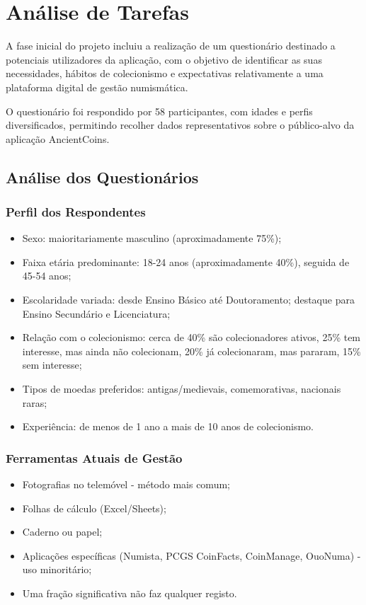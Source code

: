 \documentclass[12pt,a4paper]{article}
\begin{document}
\section{Análise de Tarefas}

A fase inicial do projeto incluiu a realização de um questionário destinado a potenciais utilizadores da aplicação, com o objetivo de identificar as suas necessidades, hábitos de colecionismo e expectativas relativamente a uma plataforma digital de gestão numismática.

O questionário foi respondido por 58 participantes, com idades e perfis diversificados, permitindo recolher dados representativos sobre o público-alvo da aplicação AncientCoins.

\subsection{Análise dos Questionários}

\subsubsection{Perfil dos Respondentes}

\begin{itemize}
\setlength{\itemsep}{0.15em}
\item Sexo: maioritariamente masculino (aproximadamente 75\%);
\item Faixa etária predominante: 18-24 anos (aproximadamente 40\%), seguida de 45-54 anos;
\item Escolaridade variada: desde Ensino Básico até Doutoramento; destaque para Ensino Secundário e Licenciatura;
\item Relação com o colecionismo: cerca de 40\% são colecionadores ativos, 25\% tem interesse, mas ainda não colecionam, 20\% já colecionaram, mas pararam, 15\% sem interesse;
\item Tipos de moedas preferidos: antigas/medievais, comemorativas, nacionais raras;
\item Experiência: de menos de 1 ano a mais de 10 anos de colecionismo.
\end{itemize}

\subsubsection{Ferramentas Atuais de Gestão}

\begin{itemize}
\setlength{\itemsep}{0.15em}
\item Fotografias no telemóvel - método mais comum;
\item Folhas de cálculo (Excel/Sheets);
\item Caderno ou papel;
\item Aplicações específicas (Numista, PCGS CoinFacts, CoinManage, OuoNuma) - uso minoritário;
\item Uma fração significativa não faz qualquer registo.
\end{itemize}
\end{document}
